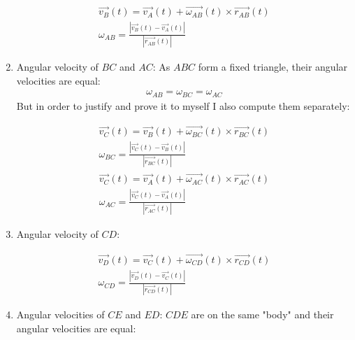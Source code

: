 \begin{enumerate}
\begin{answer}
              \begin{align}
                  \vec{v_B}(t) = \vec{v_A}(t) + \vec{\omega_{AB}}(t) \times \vec{r_{AB}}(t) \\
                  \omega_{AB} = \frac{|\vec{v_B}(t) - \vec{v_A}(t)|}{|\vec{r_{AB}}(t)|}
              \end{align}
          \end{answer}
    \item Angular velocity of $BC$ and $AC$:
          As $ABC$ form a fixed triangle, their angular velocities are equal:
          \begin{align}
              \omega_{AB} = \omega_{BC} = \omega_{AC}
          \end{align}
          But in order to justify and prove it to myself I also compute them separately:
          \begin{answer}

              \begin{align}
                  \vec{v_C}(t) = \vec{v_B}(t) + \vec{\omega_{BC}}(t) \times \vec{r_{BC}}(t) \\
                  \omega_{BC} = \frac{|\vec{v_C}(t) - \vec{v_B}(t)|}{|\vec{r_{BC}}(t)|}
              \end{align}
              \begin{align}
                  \vec{v_C}(t) = \vec{v_A}(t) + \vec{\omega_{AC}}(t) \times \vec{r_{AC}}(t) \\
                  \omega_{AC} = \frac{|\vec{v_C}(t) - \vec{v_A}(t)|}{|\vec{r_{AC}}(t)|}
              \end{align}
          \end{answer}
    \item Angular velocity of $CD$:
          \begin{answer}

              \begin{align}
                  \vec{v_D}(t) = \vec{v_C}(t) + \vec{\omega_{CD}}(t) \times \vec{r_{CD}}(t) \\
                  \omega_{CD} = \frac{|\vec{v_D}(t) - \vec{v_C}(t)|}{|\vec{r_{CD}}(t)|}
              \end{align}
          \end{answer}
    \item Angular velocities of $CE$ and $ED$:
          $CDE$ are on the same "body" and their angular velocities are equal:
          \begin{answer}


\end{answer}
\end{enumerate}
